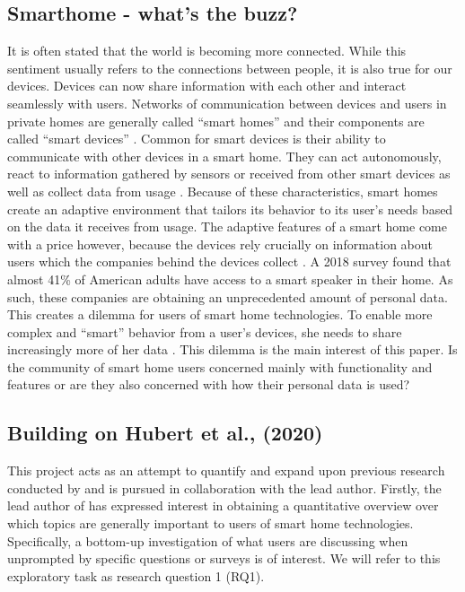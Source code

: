 \documentclass{article}
\begin{document}
    \subsection{Smarthome - what's the buzz?}
    It is often stated that the world is becoming more connected. While this sentiment usually refers to the connections between people, it is also true for our devices. Devices can now share information with each other and interact seamlessly with users. Networks of communication between devices and users in private homes are generally called “smart homes” and their components are called “smart devices” \cite{novak2019relationship}. Common for 
smart devices is their ability to communicate with other devices in a smart home. They can act autonomously, react to information gathered by sensors or received from other smart devices as well as collect data from usage \cite{hubert2020take}. Because of these characteristics, smart homes create an adaptive environment that tailors its behavior to its user’s needs based on the data it receives from usage. The adaptive features of a smart home come with a price however, because the devices rely crucially on information about users which the companies behind the devices collect \cite{novak2019relationship}. A 2018 survey \cite{perez_smart_2018} found that almost 41\% of American adults have access to a smart speaker in their home. As such, these companies are obtaining an unprecedented amount of personal data. This creates a dilemma for users of smart home technologies. To enable more complex and “smart” behavior from a user’s devices, she needs to share increasingly more of her data \cite{hubert2020take}. This dilemma is the main interest of this paper. Is the community of smart home users concerned mainly with functionality and features or are they also concerned with how their personal data is used?

    \subsection{Building on Hubert et al., (2020)}
    This project acts as an attempt to quantify and expand upon previous research conducted by  and is pursued in collaboration with the lead author. Firstly, the lead author of  has expressed interest in obtaining a quantitative overview over which topics are generally important to users of smart home technologies. Specifically, a bottom-up investigation of what users are discussing when unprompted by specific questions or surveys is of interest. We will refer to this exploratory task as research question 1 (RQ1). 
\end{document}
